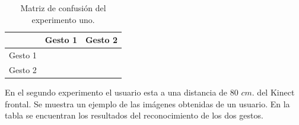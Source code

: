 \begin{table}[h!] 
\begin{center}
\begin{tabular}{ r || c | c |} 
 
        & Gesto 1 & Gesto 2 \\ \hline \hline  
Gesto 1 &     &      \\ \hline  
Gesto 2 &     &      \\   

\end{tabular}
\end{center} 
\caption{Matriz de confusión del experimento uno.}
\end{table}


En el segundo experimento el usuario esta a una distancia de $80$ $cm.$ del Kinect frontal. Se muestra un ejemplo de las imágenes obtenidas de un usuario. En la tabla se encuentran los resultados del reconocimiento de los dos gestos.   

